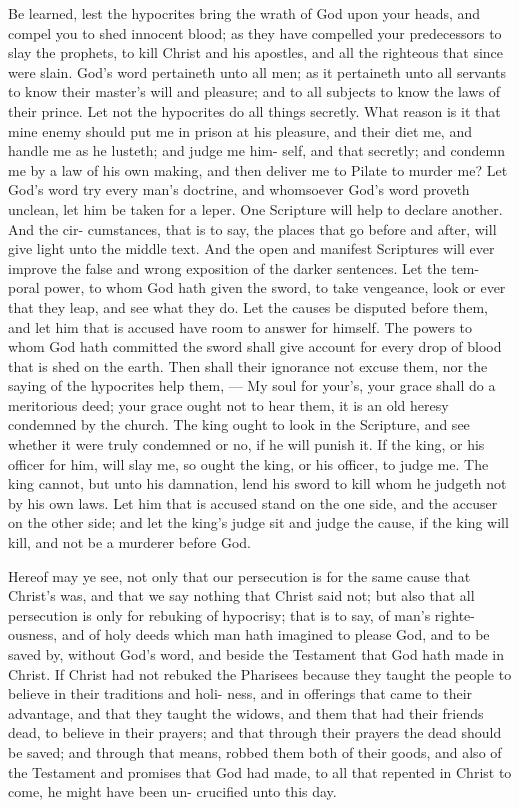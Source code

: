 \documentclass{custom}
\begin{document}
Be learned, lest the hypocrites bring the wrath of God 
upon your heads, and compel you to shed innocent blood; 
as they have compelled your predecessors to slay the 
prophets, to kill Christ and his apostles, and all the 
righteous that since were slain. God's word pertaineth 
unto all men; as it pertaineth unto all servants to know 
their master's will and pleasure; and to all subjects to 
know the laws of their prince. Let not the hypocrites do 
all things secretly. What reason is it that mine enemy 
should put me in prison at his pleasure, and their diet 
me, and handle me as he lusteth; and judge me him- 
self, and that secretly; and condemn me by a law of his 
own making, and then deliver me to Pilate to murder me? 
Let God's word try every man's doctrine, and whomsoever 
God's word proveth unclean, let him be taken for a leper. 
One Scripture will help to declare another. And the cir- 
cumstances, that is to say, the places that go before and 
after, will give light unto the middle text. And the open 
and manifest Scriptures will ever improve the false and 
wrong exposition of the darker sentences. Let the tem- 
poral power, to whom God hath given the sword, to take 
vengeance, look or ever that they leap, and see what they 
do. Let the causes be disputed before them, and let him 
that is accused have room to answer for himself. The 
powers to whom God hath committed the sword shall give 
account for every drop of blood that is shed on the 
earth. Then shall their ignorance not excuse them, nor 
the saying of the hypocrites help them, — My soul for 
your's, your grace shall do a meritorious deed; your 
grace ought not to hear them, it is an old heresy 
condemned by the church. The king ought to look in 
the Scripture, and see whether it were truly condemned 
or no, if he will punish it. If the king, or his officer for 
him, will slay me, so ought the king, or his officer, to 
judge me. The king cannot, but unto his damnation, 
lend his sword to kill whom he judgeth not by his own 
laws. Let him that is accused stand on the one side, and 
the accuser on the other side; and let the king's judge sit 
and judge the cause, if the king will kill, and not be a 
murderer before God. 

Hereof may ye see, not only that our persecution is for 
the same cause that Christ's was, and that we say nothing 
that Christ said not; but also that all persecution is only 
for rebuking of hypocrisy; that is to say, of man's righte- 
ousness, and of holy deeds which man hath imagined to 
please God, and to be saved by, without God's word, and 
beside the Testament that God hath made in Christ. 
If Christ had not rebuked the Pharisees because they 
taught the people to believe in their traditions and holi- 
ness, and in offerings that came to their advantage, and 
that they taught the widows, and them that had their 
friends dead, to believe in their prayers; and that through 
their prayers the dead should be saved; and through that 
means, robbed them both of their goods, and also of 
the Testament and promises that God had made, to all 
that repented in Christ to come, he might have been un- 
crucified unto this day. 
\end{document}
